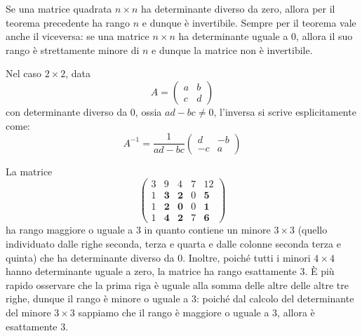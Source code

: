 \begin{observation}
	Se una matrice quadrata $n \times n$ ha determinante diverso da zero, allora
	per il teorema precedente ha rango $n$ e dunque \`e invertibile. Sempre per il
	teorema vale anche il viceversa: se una matrice $n \times n$ ha determinante
	uguale a 0, allora il suo rango \`e strettamente minore di $n$ e dunque la
	matrice non \`e invertibile.

	Nel caso $2 \times 2$, data
	\begin{equation*}
		A = \begin{pmatrix}
			a & b \\
			c & d
		\end{pmatrix}
	\end{equation*}
	con determinante diverso da 0, ossia $ad - bc \neq 0$, l'inversa si scrive
	esplicitamente come:
	\begin{equation*}
		A^{-1} = \frac{1}{ad - bc} \begin{pmatrix}
			d  & -b \\
			-c & a
		\end{pmatrix}
	\end{equation*}
\end{observation}

\begin{example}
	La matrice
	\begin{equation*}
		\begin{pmatrix}
			3 & 9          & 4          & 7 & 12         \\
			1 & \textbf{3} & \textbf{2} & 0 & \textbf{5} \\
			1 & \textbf{2} & \textbf{0} & 0 & \textbf{1} \\
			1 & \textbf{4} & \textbf{2} & 7 & \textbf{6}
		\end{pmatrix}
	\end{equation*}
	ha rango maggiore o uguale a 3 in quanto contiene un minore $3 \times 3$
	(quello individuato dalle righe seconda, terza e quarta e dalle colonne
	seconda terza e quinta) che ha determinante diverso da 0. Inoltre, poich\'e
	tutti i minori $4 \times 4$ hanno determinante uguale a zero, la matrice ha
	rango esattamente 3. \`E pi\`u rapido osservare che la prima riga \`e uguale
	alla somma delle altre delle altre tre righe, dunque il rango \`e minore o
	uguale a 3: poich\'e dal calcolo del determinante del minore $3 \times 3$
	sappiamo che il rango \`e maggiore o uguale a 3, allora \`e esattamente 3.
\end{example}

